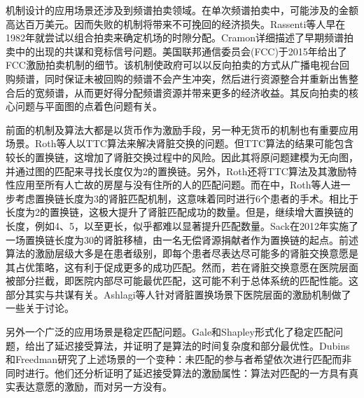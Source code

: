 \documentclass[promaster]{thesis-uestc}
\begin{document}
机制设计的应用场景还涉及到频谱拍卖领域。在单次频谱拍卖中，可能涉及的金额高达百万美元。因而失败的机制将带来不可挽回的经济损失。Rassenti等人早在1982年就尝试以组合拍卖来确定机场的时隙分配。Cramon详细描述了早期频谱拍卖中的出现的共谋和竞标信号问题。美国联邦通信委员会(FCC)于2015年给出了FCC激励拍卖机制的细节。该机制使政府可以以反向拍卖的方式从广播电视台回购频谱，同时保证未被回购的频谱不会产生冲突，然后进行资源整合并重新出售整合后的宽频谱，从而更好得分配频谱资源并带来更多的经济收益。其反向拍卖的核心问题与平面图的点着色问题有关。

前面的机制及算法大都是以货币作为激励手段，另一种无货币的机制也有重要应用场景。Roth等人以TTC算法来解决肾脏交换的问题。但TTC算法的结果可能包含较长的置换链，这增加了肾脏交换过程中的风险。因此其将原问题建模为无向图，并通过图的匹配来寻找长度仅为2的置换链。另外，Roth还将TTC算法及其激励特性应用至所有人亡故的房屋与没有住所的人的匹配问题。而在\cite{roth2007efficient}中，Roth等人进一步考虑置换链长度为3的肾脏匹配机制，这意味着同时进行6个患者的手术。相比于长度为2的置换链，这极大提升了肾脏匹配成功的数量。但是，继续增大置换链的长度，例如4、5，以至更长，似乎都难以显著提升匹配数量。Sack在2012年实施了一场置换链长度为30的肾脏移植，由一名无偿肾源捐献者作为置换链的起点。前述算法的激励层级大多是在患者级别，即每个患者尽表达尽可能多的肾脏交换意愿是其占优策略，这有利于促成更多的成功匹配。然而，若在肾脏交换意愿在医院层面被部分拦截，即医院内部尽可能最优匹配，这可能不利于总体系统的匹配性能。这部分其实与共谋有关。Ashlagi等人针对肾脏置换场景下医院层面的激励机制做了一些关于讨论。

另外一个广泛的应用场景是稳定匹配问题。Gale和Shapley形式化了稳定匹配问题，给出了延迟接受算法，并证明了是算法的时间复杂度和部分最优性。Dubins和Freedman研究了上述场景的一个变种：未匹配的参与者希望依次进行匹配而非同时进行。他们还分析证明了延迟接受算法的激励属性：算法对匹配的一方具有真实表达意愿的激励，而对另一方没有。
\end{document}
